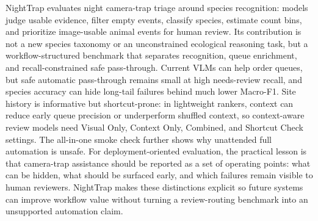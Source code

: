 \documentclass{article}
\begin{document}
NightTrap evaluates night camera-trap triage around species recognition: models judge usable evidence, filter empty events, classify species, estimate count bins, and prioritize image-usable animal events for human review. Its contribution is not a new species taxonomy or an unconstrained ecological reasoning task, but a workflow-structured benchmark that separates recognition, queue enrichment, and recall-constrained safe pass-through. Current VLMs can help order queues, but safe automatic pass-through remains small at high needs-review recall, and species accuracy can hide long-tail failures behind much lower Macro-F1. Site history is informative but shortcut-prone: in lightweight rankers, context can reduce early queue precision or underperform shuffled context, so context-aware review models need Visual Only, Context Only, Combined, and Shortcut Check settings. The all-in-one smoke check further shows why unattended full automation is unsafe. For deployment-oriented evaluation, the practical lesson is that camera-trap assistance should be reported as a set of operating points: what can be hidden, what should be surfaced early, and which failures remain visible to human reviewers. NightTrap makes these distinctions explicit so future systems can improve workflow value without turning a review-routing benchmark into an unsupported automation claim.
\end{document}
